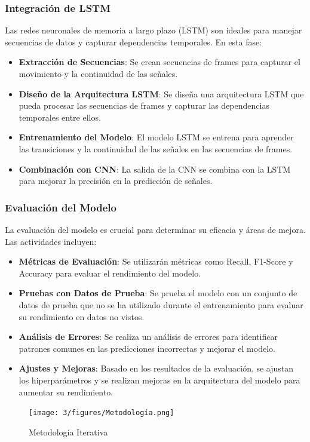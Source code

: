 \subsubsection{Integración de LSTM}
Las redes neuronales de memoria a largo plazo (LSTM) son ideales para manejar secuencias de datos y capturar dependencias temporales. En esta fase:
\begin{itemize}
	\item \textbf{Extracción de Secuencias}: Se crean secuencias de frames para capturar el movimiento y la continuidad de las señales.
	\item \textbf{Diseño de la Arquitectura LSTM}: Se diseña una arquitectura LSTM que pueda procesar las secuencias de frames y capturar las dependencias temporales entre ellos.
	\item \textbf{Entrenamiento del Modelo}: El modelo LSTM se entrena para aprender las transiciones y la continuidad de las señales en las secuencias de frames.
	\item \textbf{Combinación con CNN}: La salida de la CNN se combina con la LSTM para mejorar la precisión en la predicción de señales.
\end{itemize}

\subsubsection{Evaluación del Modelo}
La evaluación del modelo es crucial para determinar su eficacia y áreas de mejora. Las actividades incluyen:
\begin{itemize}
	\item \textbf{Métricas de Evaluación}: Se utilizarán métricas como Recall, F1-Score y Accuracy para evaluar el rendimiento del modelo.
	\item \textbf{Pruebas con Datos de Prueba}: Se prueba el modelo con un conjunto de datos de prueba que no se ha utilizado durante el entrenamiento para evaluar su rendimiento en datos no vistos.
	\item \textbf{Análisis de Errores}: Se realiza un análisis de errores para identificar patrones comunes en las predicciones incorrectas y mejorar el modelo.
	\item \textbf{Ajustes y Mejoras}: Basado en los resultados de la evaluación, se ajustan los hiperparámetros y se realizan mejoras en la arquitectura del modelo para aumentar su rendimiento.
\end{itemize}

\begin{figure}[h!]
	\centering
	\texttt{[image: 3/figures/Metodología.png]}
	\caption{Metodología Iterativa}
	\label{fig:etiqueta_de_la_figura}
\end{figure}


